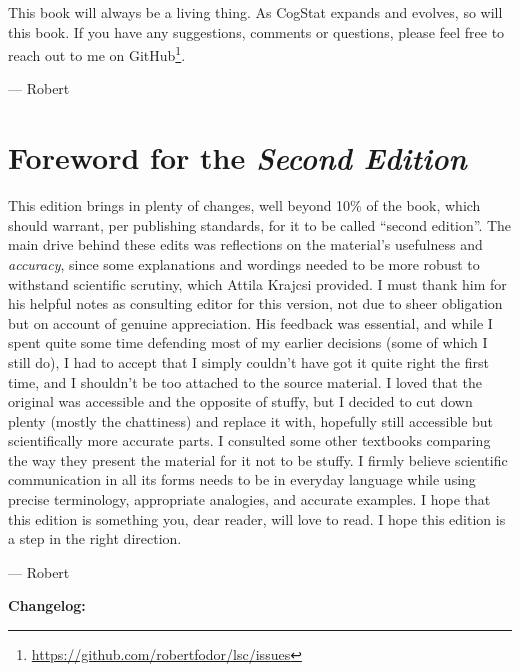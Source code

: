 \documentclass[
  11pt,
  a4paper,
  twoside,symmetric,openright]{book}
\theoremstyle{break}
\theoremstyle{break}
\DeclareRobustCommand{\href}[2]{#2\footnote{\url{#1}}}
\begin{document}
This book will always be a living thing. As CogStat expands and evolves, so will this book. If you have any suggestions, comments or questions, please feel free to reach out to me on \href{https://github.com/robertfodor/lsc/issues}{GitHub}.

\nopagebreak[4]

--- Robert

\section*{\texorpdfstring{Foreword for the \emph{Second Edition}}{Foreword for the Second Edition}}\label{foreword-for-the-second-edition}

This edition brings in plenty of changes, well beyond 10\% of the book, which should warrant, per publishing standards, for it to be called ``second edition''. The main drive behind these edits was reflections on the material's usefulness and \emph{accuracy}, since some explanations and wordings needed to be more robust to withstand scientific scrutiny, which Attila Krajcsi provided. I must thank him for his helpful notes as consulting editor for this version, not due to sheer obligation but on account of genuine appreciation. His feedback was essential, and while I spent quite some time defending most of my earlier decisions (some of which I still do), I had to accept that I simply couldn't have got it quite right the first time, and I shouldn't be too attached to the source material. I loved that the original was accessible and the opposite of stuffy, but I decided to cut down plenty (mostly the chattiness) and replace it with, hopefully still accessible but scientifically more accurate parts. I consulted some other textbooks comparing the way they present the material for it not to be stuffy. I firmly believe scientific communication in all its forms needs to be in everyday language while using precise terminology, appropriate analogies, and accurate examples. I hope that this edition is something you, dear reader, will love to read. I hope this edition is a step in the right direction.

\nopagebreak[4]

--- Robert

\textbf{Changelog:}
\end{document}
